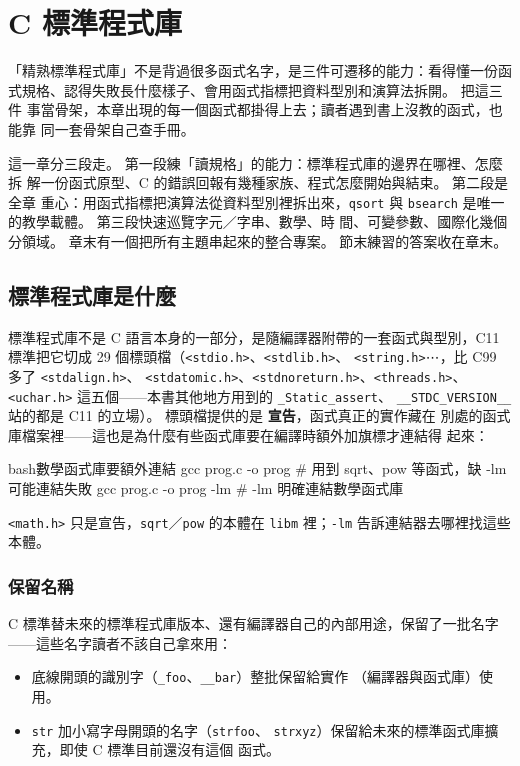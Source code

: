 \chapter{C 標準程式庫}
\label{ch:stdlib}

「精熟標準程式庫」不是背過很多函式名字，是三件可遷移的能力：看得懂一份函
式規格、認得失敗長什麼樣子、會用函式指標把資料型別和演算法拆開。 把這三件
事當骨架，本章出現的每一個函式都掛得上去；讀者遇到書上沒教的函式，也能靠
同一套骨架自己查手冊。

這一章分三段走。 第一段練「讀規格」的能力：標準程式庫的邊界在哪裡、怎麼拆
解一份函式原型、C 的錯誤回報有幾種家族、程式怎麼開始與結束。 第二段是全章
重心：用函式指標把演算法從資料型別裡拆出來，\texttt{qsort} 與
\texttt{bsearch} 是唯一的教學載體。 第三段快速巡覽字元／字串、數學、時
間、可變參數、國際化幾個分領域。 章末有一個把所有主題串起來的整合專案。
節末練習的答案收在章末。

\section{標準程式庫是什麼}
\label{sec:sl-what}

標準程式庫不是 C 語言本身的一部分，是隨編譯器附帶的一套函式與型別，C11
標準把它切成 29 個標頭檔（\texttt{<stdio.h>}、\texttt{<stdlib.h>}、
\texttt{<string.h>}⋯，比 C99 多了 \texttt{<stdalign.h>}、
\texttt{<stdatomic.h>}、\texttt{<stdnoreturn.h>}、\texttt{<threads.h>}、
\texttt{<uchar.h>} 這五個——本書其他地方用到的 \texttt{\_Static\_assert}、
\texttt{\_\_STDC\_VERSION\_\_} 站的都是 C11 的立場）。 標頭檔提供的是
\textbf{宣告}，函式真正的實作藏在
別處的函式庫檔案裡——這也是為什麼有些函式庫要在編譯時額外加旗標才連結得
起來：

\begin{code}{bash}{數學函式庫要額外連結}
gcc prog.c -o prog       # 用到 sqrt、pow 等函式，缺 -lm 可能連結失敗
gcc prog.c -o prog -lm   # -lm 明確連結數學函式庫
\end{code}

\texttt{<math.h>} 只是宣告，\texttt{sqrt}／\texttt{pow} 的本體在
\texttt{libm} 裡；\texttt{-lm} 告訴連結器去哪裡找這些本體。

\subsection{保留名稱}

C 標準替未來的標準程式庫版本、還有編譯器自己的內部用途，保留了一批名字
——這些名字讀者不該自己拿來用：

\begin{itemize}
\item 底線開頭的識別字（\texttt{\_foo}、\texttt{\_\_bar}）整批保留給實作
（編譯器與函式庫）使用。
\item \texttt{str} 加小寫字母開頭的名字（\texttt{strfoo}、
\texttt{strxyz}）保留給未來的標準函式庫擴充，即使 C 標準目前還沒有這個
函式。
\end{itemize}

